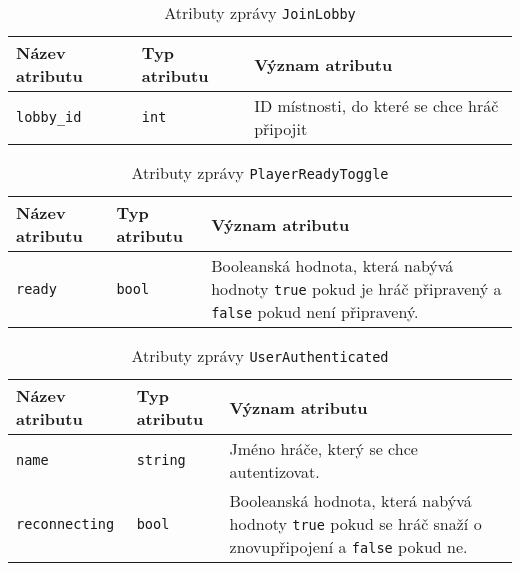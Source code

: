 \documentclass[12pt, a4paper]{article}
\begin{document}
		
\begin{center}
		\begin{table}[!ht]
		     \caption{Atributy zprávy \texttt{JoinLobby}}
		\begin{tabularx}{\textwidth}{|l|l|X|}
			\hline
			\textbf{Název atributu} & \textbf{Typ atributu} & \textbf{Význam atributu} \\ 
			\hline
			\texttt{lobby\_id}          &\texttt{int}&ID místnosti, do které se chce hráč připojit\\
			\hline
		\end{tabularx}
		\end{table}
\end{center}  		
		
\begin{center}
		\begin{table}[!ht]
		     \caption{Atributy zprávy \texttt{PlayerReadyToggle}}
		\begin{tabularx}{\textwidth}{|l|l|X|}
			\hline
			\textbf{Název atributu} & \textbf{Typ atributu} & \textbf{Význam atributu} \\ 
			\hline
			\texttt{ready}          &\texttt{bool}&Booleanská hodnota, která nabývá hodnoty \texttt{true} pokud je hráč připravený a \texttt{false} pokud není připravený.\\
			\hline
		\end{tabularx}
		\end{table}
\end{center}  
		
\begin{center}
		\begin{table}[!ht]
		     \caption{Atributy zprávy \texttt{UserAuthenticated}}
		\begin{tabularx}{\textwidth}{|l|l|X|}
			\hline
			\textbf{Název atributu} & \textbf{Typ atributu} & \textbf{Význam atributu} \\ 
			\hline
			\texttt{name}          &\texttt{string}&Jméno hráče, který se chce autentizovat.\\
			\hline
			\texttt{reconnecting}          &\texttt{bool}&Booleanská hodnota, která nabývá hodnoty \texttt{true} pokud se hráč snaží o znovupřipojení a \texttt{false} pokud ne.\\
			\hline
		\end{tabularx}
		\end{table}
\end{center}  
\end{document}
